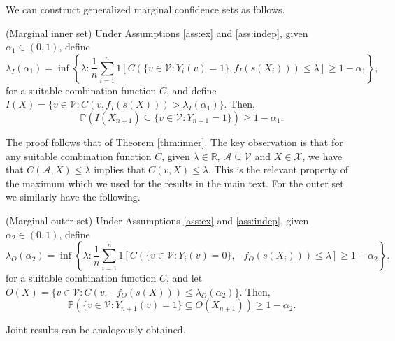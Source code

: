 We can construct generalized marginal confidence sets as follows.
\begin{theorem}\label{thm:innergen}
	(Marginal inner set)
	Under Assumptions \ref{ass:ex} and \ref{ass:indep}, given $\alpha_1 \in (0,1)$, define 
	\begin{equation*}
		\lambda_I(\alpha_1) = \inf\left\lbrace \lambda: \frac{1}{n} \sum_{i = 1}^n 1\left[ C(\lbrace v \in \mathcal{V}: Y_i(v) = 1\rbrace, f_I(s(X_i))) \leq \lambda \right] \geq 1-\alpha_1 \right\rbrace,
	\end{equation*}
 	for a suitable combination function $C$, and define $I(X) = \lbrace v \in \mathcal{V}: C(v, f_I(s(X))) >\lambda_I(\alpha_1)  \rbrace $. Then,
	\begin{equation}\label{eq:probstat}
		\mathbb{P}\left( I(X_{n+1}) \subseteq\lbrace v\in \mathcal{V}: Y_{n+1} = 1 \rbrace \right) \geq 1 - \alpha_1.
	\end{equation}
\end{theorem}
The proof follows that of Theorem \ref{thm:inner}. The key observation is that for any suitable combination function $C$,  given $\lambda \in \mathbb{R}$, $\mathcal{A} \subseteq \mathcal{V} $ and $X \in \mathcal{X}$, we have that $C(\mathcal{A}, X) \leq \lambda$ implies that $C(v, X) \leq \lambda$. This is the relevant property of the maximum which we used for the results in the main text. For the outer set we similarly have the following.
\begin{theorem}\label{thm:genouter}
	(Marginal outer set)
	Under Assumptions \ref{ass:ex} and \ref{ass:indep}, given $\alpha_2 \in (0,1)$, define 
	\begin{equation*}
		\lambda_O({\alpha_2})= \inf\left\lbrace \lambda: \frac{1}{n} \sum_{i = 1}^n 1\left[ C(\lbrace v \in \mathcal{V}: Y_i(v) = 0\rbrace, -f_O(s(X_i))) \leq \lambda \right] \geq 1-\alpha_2 \right\rbrace.
	\end{equation*}
	for a suitable combination function $C$, and let $O(X) = \lbrace v \in \mathcal{V}: C(v, -f_O(s(X))) \leq \lambda_O(\alpha_2)  \rbrace $. Then,
	\begin{equation}\label{eq:probstat}
		\mathbb{P}\left( \lbrace v\in \mathcal{V}: Y_{n+1}(v) = 1 \rbrace \subseteq O(X_{n+1}) \right) \geq 1 - \alpha_2.
	\end{equation}
\end{theorem}
Joint results can be analogously obtained. 


